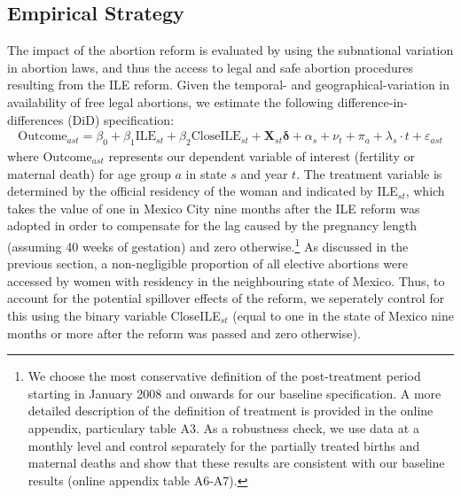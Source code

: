 \documentclass[a4paper, 11pt]{article}
\begin{document}
\begin{spacing}{2}
\section{Empirical Strategy} \label{methodology}
The impact of the abortion reform is evaluated by using the subnational variation in abortion laws, and thus the access to legal and safe abortion procedures resulting from the ILE reform.  Given the temporal- and geographical-variation in availability of free legal abortions, we estimate the following difference-in-differences (DiD) specification:
\begin{eqnarray}\label{eq1}
	\text{Outcome}_{ast}= \beta_0 + \beta_1 \text{ILE}_{st} +\beta_2 \text{CloseILE}_{st}+ \bm{X}_{st}\bm{\delta} +\alpha_{s} + \nu_{t} +\pi_{a}+ \lambda_{s}\cdot t +\varepsilon_{ast}   
\end{eqnarray}
where Outcome$_{ast}$ represents our dependent variable of interest (fertility or maternal death) for age group $a$ in state $s$ and year $t$.  The treatment variable is determined by the official residency of the woman and indicated by ILE$_{st}$, which takes the value of one in Mexico City nine months after the ILE reform was adopted in order to compensate for the lag caused by the pregnancy length (assuming 40 weeks of gestation) and zero otherwise.\footnote{We choose the most conservative definition of the post-treatment period starting in January 2008 and onwards for our baseline specification. A more detailed description of the definition of treatment is provided in the online appendix, particulary table A3.  As a robustness check, we use data at a monthly level and control separately for the partially treated births and maternal deaths and show that these results are consistent with our baseline results (online appendix table A6-A7).} As discussed in the previous section, a non-negligible proportion of all elective abortions were accessed by women with residency in the neighbouring state of Mexico. Thus, to account for the potential spillover effects of the reform, we seperately control for this using the binary variable CloseILE$_{st}$ (equal to one in the state of Mexico nine months or more after the reform was passed and zero otherwise). 


\end{spacing}
\end{document}

